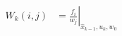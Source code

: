 \documentclass{article}
\begin{document}
\pagestyle{empty}

\begin{equation}
	\begin{split}
	W_k(i,j) &= \left. \frac{f_i}{w_j} \right \vert_{\hat{x}_{k-1},u_k,w_0}
	\end{split}
\end{equation}
\end{document}
